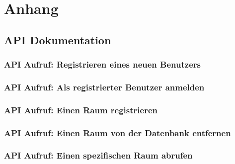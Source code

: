 \section{Anhang}


%
\subsection{API Dokumentation}\label{API_Doc}

\subsubsection{API Aufruf: Registrieren eines neuen Benutzers}
\label{app:API_register}

\subsubsection{API Aufruf: Als registrierter Benutzer anmelden}
\label{app:API_login}

\subsubsection{API Aufruf: Einen Raum registrieren}
\label{app:API_register_room}

\subsubsection{API Aufruf: Einen Raum von der Datenbank entfernen}
\label{app:API_delete_room}

\subsubsection{API Aufruf: Einen spezifischen Raum abrufen}
\label{app:API_show_room}

